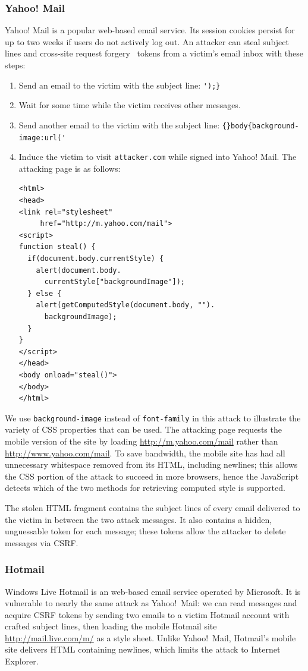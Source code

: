 \documentclass{sig-alternate}
\begin{document}
\subsubsection{Yahoo! Mail}
Yahoo! Mail is a popular web-based email service.  Its session cookies
persist for up to two weeks if users do not actively log out.  An
attacker can steal subject lines and cross-site request forgery~\cite{csrf}
tokens from a victim's email inbox with these steps:

\begin{enumerate}
\item Send an email to the victim with the subject line:
  \verb|');}|
\item Wait for some time while the victim receives other messages.
\item Send another email to the victim with the subject line:
  \verb|{}body{background-image:url('|
\item Induce the victim to visit \texttt{attacker.com} while signed
  into Yahoo! Mail.  The attacking page is as follows:
\begin{verbatim}
<html>
<head>
<link rel="stylesheet"
     href="http://m.yahoo.com/mail">
<script>
function steal() {
  if(document.body.currentStyle) {
    alert(document.body.
      currentStyle["backgroundImage"]);
  } else {
    alert(getComputedStyle(document.body, "").
      backgroundImage);
  }
}
</script>
</head>
<body onload="steal()">
</body>
</html>
\end{verbatim}
\end{enumerate}

We use \texttt{background-image} instead of \texttt{font-family} in
this attack to illustrate the variety of CSS properties that can be
used.  The attacking page requests the mobile version of the site by
loading \url{http://m.yahoo.com/mail} rather than
\url{http://www.yahoo.com/mail}.  To save bandwidth, the mobile site
has had all unnecessary whitespace removed from its HTML, including
newlines; this allows the CSS portion of the attack to succeed in more
browsers, hence the JavaScript detects which of the two methods for
retrieving computed style is supported.

The stolen HTML fragment contains the subject lines of every email
delivered to the victim in between the two attack messages.  It also
contains a hidden, unguessable token for each message; these tokens
allow the attacker to delete messages via CSRF.

\subsubsection{Hotmail}
Windows Live Hotmail is an web-based email service operated by
Microsoft. It is vulnerable to nearly the same attack as Yahoo!\  Mail:
we can read messages and acquire CSRF tokens by sending two emails to
a victim Hotmail account with crafted subject lines, then loading the
mobile Hotmail site \url{http://mail.live.com/m/} as a style
sheet. Unlike Yahoo!\ Mail, Hotmail's mobile site delivers HTML
containing newlines, which limits the attack to Internet Explorer.
\end{document}
